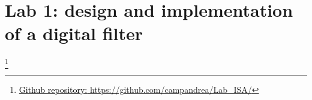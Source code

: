 


\chapter{Lab 1: design and implementation of a digital filter}
{\let\thefootnote\relax\footnote{{\href{https://github.com/campandrea/Lab_ISA/}{\textcolor{black}{Github repository:} https://github.com/campandrea/Lab\_ISA/}}}}





